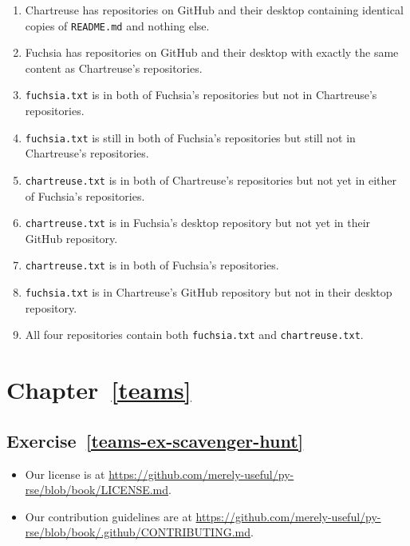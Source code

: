 \documentclass[
]{krantz}
\providecommand{\tightlist}{%
  \setlength{\itemsep}{0pt}\setlength{\parskip}{0pt}}
\begin{document}
\begin{enumerate}
\def\labelenumi{\arabic{enumi}.}
\tightlist
\item
  Chartreuse has repositories on GitHub and their desktop
  containing identical copies of \texttt{README.md} and nothing else.
\item
  Fuchsia has repositories on GitHub and their desktop
  with exactly the same content as Chartreuse's repositories.
\item
  \texttt{fuchsia.txt} is in both of Fuchsia's repositories
  but not in Chartreuse's repositories.
\item
  \texttt{fuchsia.txt} is still in both of Fuchsia's repositories
  but still not in Chartreuse's repositories.
\item
  \texttt{chartreuse.txt} is in both of Chartreuse's repositories
  but not yet in either of Fuchsia's repositories.
\item
  \texttt{chartreuse.txt} is in Fuchsia's desktop repository
  but not yet in their GitHub repository.
\item
  \texttt{chartreuse.txt} is in both of Fuchsia's repositories.
\item
  \texttt{fuchsia.txt} is in Chartreuse's GitHub repository
  but not in their desktop repository.
\item
  All four repositories contain both \texttt{fuchsia.txt} and \texttt{chartreuse.txt}.
\end{enumerate}

\hypertarget{chapter-refteams}{%
\section*{Chapter~\ref{teams}}\label{chapter-refteams}}

\hypertarget{exercise-refteams-ex-scavenger-hunt}{%
\subsection*{Exercise~\ref{teams-ex-scavenger-hunt}}\label{exercise-refteams-ex-scavenger-hunt}}


\begin{itemize}
\item
  Our license is at \url{https://github.com/merely-useful/py-rse/blob/book/LICENSE.md}.
\item
  Our contribution guidelines are at \url{https://github.com/merely-useful/py-rse/blob/book/.github/CONTRIBUTING.md}.
\end{itemize}
\end{document}

